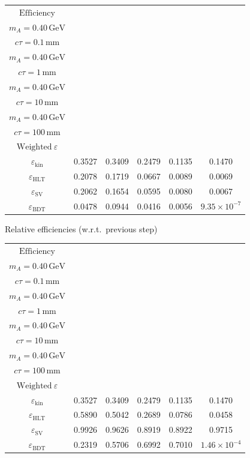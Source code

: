 \documentclass[10pt,a4paper]{article}
\begin{document}
{\begin{tabular}{cccccc}
\toprule
$\mathrm{Efficiency}$ & \shortstack{$m_{\pi}=4\,\mathrm{GeV}$\\$m_{A}=0.40\,\mathrm{GeV}$\\$c\tau=0.1\,\mathrm{mm}$} & \shortstack{$m_{\pi}=4\,\mathrm{GeV}$\\$m_{A}=0.40\,\mathrm{GeV}$\\$c\tau=1\,\mathrm{mm}$} & \shortstack{$m_{\pi}=4\,\mathrm{GeV}$\\$m_{A}=0.40\,\mathrm{GeV}$\\$c\tau=10\,\mathrm{mm}$} & \shortstack{$m_{\pi}=4\,\mathrm{GeV}$\\$m_{A}=0.40\,\mathrm{GeV}$\\$c\tau=100\,\mathrm{mm}$} & \shortstack{$\mathrm{QCD}$\\$\mathrm{Weighted}\ \varepsilon$} \\
\midrule
$\varepsilon_{\mathrm{kin}}$ & 0.3527 & 0.3409 & 0.2479 & 0.1135 & 0.1470\\
$\varepsilon_{\mathrm{HLT}}$ & 0.2078 & 0.1719 & 0.0667 & 0.0089 & 0.0069\\
$\varepsilon_{\mathrm{SV}}$ & 0.2062 & 0.1654 & 0.0595 & 0.0080 & 0.0067\\
$\varepsilon_{\mathrm{BDT}}$ & 0.0478 & 0.0944 & 0.0416 & 0.0056 & $9.35\times10^{-7}$\\
\bottomrule
\end{tabular}

\vspace{18pt}

Relative efficiencies (w.r.t.\ previous step)

\begin{tabular}{cccccc}
\toprule
$\mathrm{Efficiency}$ & \shortstack{$m_{\pi}=4\,\mathrm{GeV}$\\$m_{A}=0.40\,\mathrm{GeV}$\\$c\tau=0.1\,\mathrm{mm}$} & \shortstack{$m_{\pi}=4\,\mathrm{GeV}$\\$m_{A}=0.40\,\mathrm{GeV}$\\$c\tau=1\,\mathrm{mm}$} & \shortstack{$m_{\pi}=4\,\mathrm{GeV}$\\$m_{A}=0.40\,\mathrm{GeV}$\\$c\tau=10\,\mathrm{mm}$} & \shortstack{$m_{\pi}=4\,\mathrm{GeV}$\\$m_{A}=0.40\,\mathrm{GeV}$\\$c\tau=100\,\mathrm{mm}$} & \shortstack{$\mathrm{QCD}$\\$\mathrm{Weighted}\ \varepsilon$} \\
\midrule
$\varepsilon_{\mathrm{kin}}$ & 0.3527 & 0.3409 & 0.2479 & 0.1135 & 0.1470\\
$\varepsilon_{\mathrm{HLT}}$ & 0.5890 & 0.5042 & 0.2689 & 0.0786 & 0.0458\\
$\varepsilon_{\mathrm{SV}}$ & 0.9926 & 0.9626 & 0.8919 & 0.8922 & 0.9715\\
$\varepsilon_{\mathrm{BDT}}$ & 0.2319 & 0.5706 & 0.6992 & 0.7010 & $1.46\times10^{-4}$\\
\bottomrule
\end{tabular}

}
\end{document}
